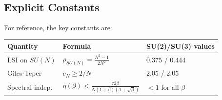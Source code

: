 \subsection{Explicit Constants}
\label{subsec:explicit-constants}

For reference, the key constants are:

\begin{center}
\begin{tabular}{|l|l|l|}
\hline
\textbf{Quantity} & \textbf{Formula} & \textbf{SU(2)/SU(3) values} \\
\hline
LSI on $SU(N)$ & $\rho_{SU(N)} = \frac{N^2-1}{2N^2}$ & $0.375$ / $0.444$ \\
Giles-Teper & $c_N \geq 2/N$ & $2.05$ / $2.05$ \\
Spectral indep. & $\eta(\beta) < \frac{72\beta}{N(1+\beta)(1+\sqrt{\beta})}$ & $< 1$ for all $\beta$ \\
\hline
\end{tabular}
\end{center}






